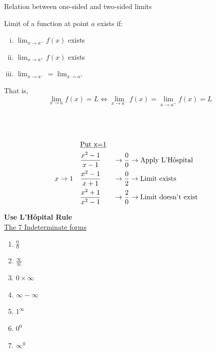 \documentclass[12pt]{article}
\begin{document}
\begin{theorem}{Relation between one-sided and two-sided limits}
    
    Limit of a function at point $a$ exists if:
    \begin{enumerate}[(i)]
        \item $\lim_{x \to a^-} f(x)$ exists
        \item $\lim_{x \to a^+} f(x)$ exists
        \item $\lim_{x \to a^-} = \lim_{x \to a^+}$ 
    \end{enumerate}
    That is, \[
        \lim_{x \to a} f(x) = L \iff \lim_{x \to a^-} f(x) = \lim_{x \to a^+} f(x) = L 
    \]
\end{theorem} \\~\\

\begin{minipage}{0.6\textwidth}
    \begin{alignat*}{2}
             & \text{\underline{Put x=1}}\\
             & \frac{x^2-1}{x-1} &&\to \frac{0}{0} \to \text{Apply L'H\^ospital} \\
        x\to1 \quad & \frac{x^2-1}{x+1} &&\to \frac{0}{2} \to \text{Limit exists} \\
             & \frac{x^2+1}{x^2-1} &&\to \frac{2}{0} \to \text{Limit doesn't exist} \\
    \end{alignat*}
\end{minipage}
\begin{minipage}{0.3\textwidth}
    \textbf{Use L'H\^opital Rule}\\
    \underline{The 7 Indeterminate forms} \\
    \begin{enumerate}[(1)]
        \item $\frac{0}{0}$ 
        \item $\frac{\infty}{\infty}$ 
        \item $0 \times \infty$ 
        \item $\infty-\infty$
        \item $1^{\infty}$ 
        \item $0^0$ 
        \item $\infty^0$
    \end{enumerate}
\end{minipage}
\end{document}
